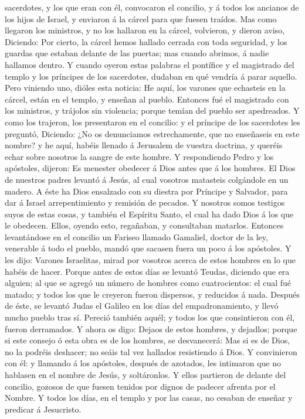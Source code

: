 sacerdotes, y los que eran con él, convocaron el concilio, y á todos los
ancianos de los hijos de Israel, y enviaron á la cárcel para que fuesen
traídos.  Mas como llegaron los ministros, y no los
hallaron en la cárcel, volvieron, y dieron aviso, 
Diciendo: Por cierto, la cárcel hemos hallado cerrada con toda
seguridad, y los guardas que estaban delante de las puertas; mas cuando
abrimos, á nadie hallamos dentro.  Y cuando oyeron estas
palabras el pontífice y el magistrado del templo y los príncipes de los
sacerdotes, dudaban en qué vendría á parar aquello.  Pero
viniendo uno, dióles esta noticia: He aquí, los varones que echasteis en
la cárcel, están en el templo, y enseñan al pueblo. 
Entonces fué el magistrado con los ministros, y trájolos sin violencia;
porque temían del pueblo ser apedreados.  Y como los
trajeron, los presentaron en el concilio: y el príncipe de los
sacerdotes les preguntó,  Diciendo: ¿No os denunciamos
estrechamente, que no enseñaseis en este nombre? y he aquí, habéis
llenado á Jerusalem de vuestra doctrina, y queréis echar sobre nosotros
la sangre de este hombre.  Y respondiendo Pedro y los
apóstoles, dijeron: Es menester obedecer á Dios antes que á los hombres.
 El Dios de nuestros padres levantó á Jesús, al cual
vosotros matasteis colgándole en un madero.  A éste ha
Dios ensalzado con su diestra por Príncipe y Salvador, para dar á Israel
arrepentimiento y remisión de pecados.  Y nosotros somos
testigos suyos de estas cosas, y también el Espíritu Santo, el cual ha
dado Dios á los que le obedecen.  Ellos, oyendo esto,
regañaban, y consultaban matarlos.  Entonces levantándose
en el concilio un Fariseo llamado Gamaliel, doctor de la ley, venerable
á todo el pueblo, mandó que sacasen fuera un poco á los apóstoles.
 Y les dijo: Varones Israelitas, mirad por vosotros
acerca de estos hombres en lo que habéis de hacer. 
Porque antes de estos días se levantó Teudas, diciendo que era alguien;
al que se agregó un número de hombres como cuatrocientos: el cual fué
matado; y todos los que le creyeron fueron dispersos, y reducidos á
nada.  Después de éste, se levantó Judas el Galileo en
los días del empadronamiento, y llevó mucho pueblo tras sí. Pereció
también aquél; y todos los que consintieron con él, fueron derramados.
 Y ahora os digo: Dejaos de estos hombres, y dejadlos;
porque si este consejo ó esta obra es de los hombres, se desvanecerá:
 Mas si es de Dios, no la podréis deshacer; no seáis tal
vez hallados resistiendo á Dios.  Y convinieron con él: y
llamando á los apóstoles, después de azotados, les intimaron que no
hablasen en el nombre de Jesús, y soltáronlos.  Y ellos
partieron de delante del concilio, gozosos de que fuesen tenidos por
dignos de padecer afrenta por el Nombre.  Y todos los
días, en el templo y por las casas, no cesaban de enseñar y predicar á
Jesucristo.


